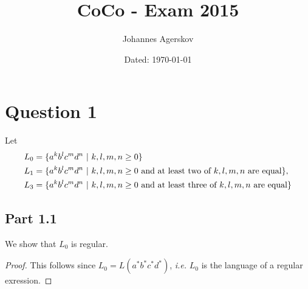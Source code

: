 \documentclass[a4paper,11pt]{article}
\author{Johannes Agerskov}
\date{Dated: \today}
\title{CoCo - Exam 2015}
\newcommand{\ie}{\emph{i.e.} }
\newcommand{\pipe}{\ \vert \ }
\numberwithin{equation}{section}
\begin{document}
	
	\maketitle
	\section*{Question 1}

	Let \begin{equation}
		\begin{aligned}
		L_0&=\{a^kb^lc^md^n\pipe k,l,m,n\geq0\}\\
		L_1&=\{a^kb^lc^md^n\pipe k,l,m,n\geq0\text{ and at least two of $ k,l,m,n $ are equal}\},\\
		L_3&=\{a^kb^lc^md^n\pipe k,l,m,n\geq0\text{ and at least three of $ k,l,m,n $ are equal}\}
		\end{aligned}
	\end{equation}
		\subsection*{Part 1.1}
		We show that $ L_0 $ is regular. \begin{proof}
			This follows since $ L_0=L(a^*b^*c^*d^*) $, \ie $ L_0 $ is the language of a regular exression.
		\end{proof}
\end{document}
